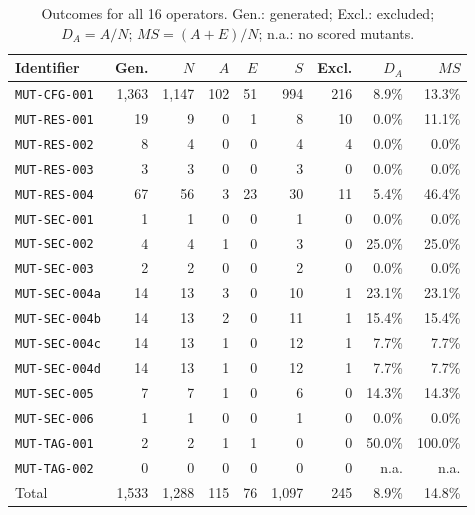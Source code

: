 \documentclass[3p,times,procedia]{elsarticle}
\newcommand{\code}[1]{\texttt{#1}}
\newcommand{\na}{\textnormal{n.a.}}
\begin{document}
\begin{table}[ht]
\caption{Outcomes for all 16 operators. Gen.: generated; Excl.: excluded; $D_A=A/N$; $MS=(A+E)/N$; n.a.: no scored mutants.}\label{tab:operatorresults}
\small\begin{tabularx}{\linewidth}{@{}Xrrrrrrrr@{}}\toprule
Identifier & Gen. & $N$ & $A$ & $E$ & $S$ & Excl. & $D_A$ & $MS$\\\midrule
\code{MUT-CFG-001} & 1,363 & 1,147 & 102 & 51 & 994 & 216 & 8.9\% & 13.3\%\\
\code{MUT-RES-001} & 19 & 9 & 0 & 1 & 8 & 10 & 0.0\% & 11.1\%\\
\code{MUT-RES-002} & 8 & 4 & 0 & 0 & 4 & 4 & 0.0\% & 0.0\%\\
\code{MUT-RES-003} & 3 & 3 & 0 & 0 & 3 & 0 & 0.0\% & 0.0\%\\
\code{MUT-RES-004} & 67 & 56 & 3 & 23 & 30 & 11 & 5.4\% & 46.4\%\\
\code{MUT-SEC-001} & 1 & 1 & 0 & 0 & 1 & 0 & 0.0\% & 0.0\%\\
\code{MUT-SEC-002} & 4 & 4 & 1 & 0 & 3 & 0 & 25.0\% & 25.0\%\\
\code{MUT-SEC-003} & 2 & 2 & 0 & 0 & 2 & 0 & 0.0\% & 0.0\%\\
\code{MUT-SEC-004a} & 14 & 13 & 3 & 0 & 10 & 1 & 23.1\% & 23.1\%\\
\code{MUT-SEC-004b} & 14 & 13 & 2 & 0 & 11 & 1 & 15.4\% & 15.4\%\\
\code{MUT-SEC-004c} & 14 & 13 & 1 & 0 & 12 & 1 & 7.7\% & 7.7\%\\
\code{MUT-SEC-004d} & 14 & 13 & 1 & 0 & 12 & 1 & 7.7\% & 7.7\%\\
\code{MUT-SEC-005} & 7 & 7 & 1 & 0 & 6 & 0 & 14.3\% & 14.3\%\\
\code{MUT-SEC-006} & 1 & 1 & 0 & 0 & 1 & 0 & 0.0\% & 0.0\%\\
\code{MUT-TAG-001} & 2 & 2 & 1 & 1 & 0 & 0 & 50.0\% & 100.0\%\\
\code{MUT-TAG-002} & 0 & 0 & 0 & 0 & 0 & 0 & \na & \na\\\midrule
Total & 1,533 & 1,288 & 115 & 76 & 1,097 & 245 & 8.9\% & 14.8\%\\\bottomrule
\end{tabularx}\end{table}
\end{document}
